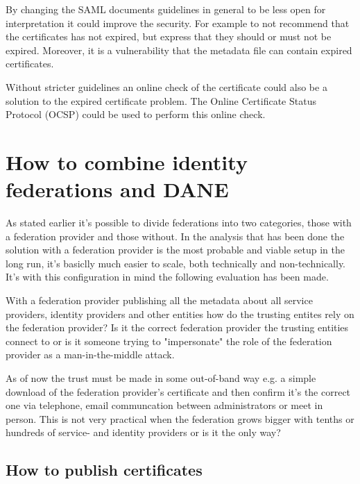 By changing the SAML documents guidelines in general to be less open for interpretation it could improve the security. 
For example to not recommend that the certificates has not expired, but express that they should or must not be expired. 
Moreover, it is a vulnerability that the metadata file can contain expired certificates.

Without stricter guidelines an online check of the certificate could also be a solution to the expired certificate problem. 
The Online Certificate Status Protocol (OCSP) \cite{rfc:6277} could be used to perform this online check.

\section{How to combine identity federations and DANE}
As stated earlier it's possible to divide federations into two categories, those with a federation provider and those without.
In the analysis that has been done the solution with a federation provider is the most probable and viable setup in the long run, it's basiclly much easier to scale, both technically and non-technically.
It's with this configuration in mind the following evaluation has been made.


With a federation provider publishing all the metadata about all service providers, identity providers and other entities how do the trusting entites rely on the federation provider?
Is it the correct federation provider the trusting entities connect to or is it someone trying to "impersonate" the role of the federation provider as a man-in-the-middle attack.

As of now the trust must be made in some out-of-band way e.g. a simple download of the federation provider's certificate and then confirm it's the correct one via telephone, email communcation between administrators or meet in person.
This is not very practical when the federation grows bigger with tenths or hundreds of service- and identity providers or is it the only way?
\subsection{How to publish certificates}
